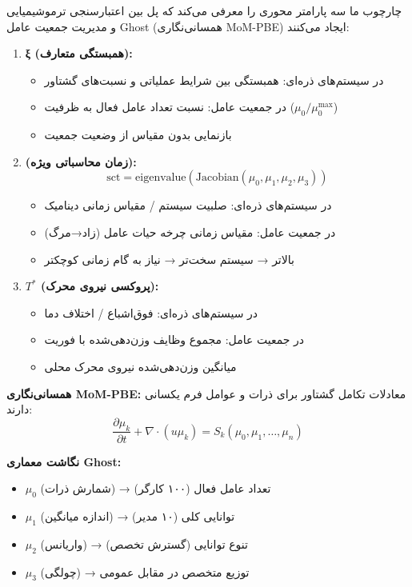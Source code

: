 \documentclass[12pt, a4paper]{article}
\begin{document}
چارچوب ما سه پارامتر محوری را معرفی می‌کند که پل بین اعتبارسنجی ترموشیمیایی و مدیریت جمعیت عامل Ghost (همسانی‌نگاری MoM-PBE) ایجاد می‌کنند:

\begin{enumerate}
\item \textbf{ξ (همبستگی متعارف):}
\begin{itemize}
\item در سیستم‌های ذره‌ای: همبستگی بین شرایط عملیاتی و نسبت‌های گشتاور
\item در جمعیت عامل: نسبت تعداد عامل فعال به ظرفیت ($\mu_0 / \mu_0^{\text{max}}$)
\item بازنمایی بدون مقیاس از وضعیت جمعیت
\end{itemize}

\item \textbf{ (زمان محاسباتی ویژه):}
\begin{equation}
\text{sct} = \text{eigenvalue}(\text{Jacobian}(\mu_0, \mu_1, \mu_2, \mu_3))
\end{equation}
\begin{itemize}
\item در سیستم‌های ذره‌ای: صلبیت سیستم / مقیاس زمانی دینامیک
\item در جمعیت عامل: مقیاس زمانی چرخه حیات عامل (زاد→مرگ)
\item بالاتر → سیستم سخت‌تر → نیاز به گام زمانی کوچکتر
\end{itemize}

\item \textbf{$T^*$ (پروکسی نیروی محرک):}
\begin{itemize}
\item در سیستم‌های ذره‌ای: فوق‌اشباع / اختلاف دما
\item در جمعیت عامل: مجموع وظایف وزن‌دهی‌شده با فوریت
\item میانگین وزن‌دهی‌شده نیروی محرک محلی
\end{itemize}
\end{enumerate}

\textbf{همسانی‌نگاری MoM-PBE:} معادلات تکامل گشتاور برای ذرات و عوامل فرم یکسانی دارند:
\begin{equation}
\frac{\partial \mu_k}{\partial t} + \nabla \cdot (u \mu_k) = S_k(\mu_0, \mu_1, \ldots, \mu_n)
\end{equation}

\textbf{نگاشت معماری Ghost:}
\begin{itemize}
\item $\mu_0$ (شمارش ذرات) → تعداد عامل فعال (۱۰۰ کارگر)
\item $\mu_1$ (اندازه میانگین) → توانایی کلی (۱۰ مدیر)
\item $\mu_2$ (واریانس) → تنوع توانایی (گسترش تخصص)
\item $\mu_3$ (چولگی) → توزیع متخصص در مقابل عمومی
\end{itemize}
\end{document}
